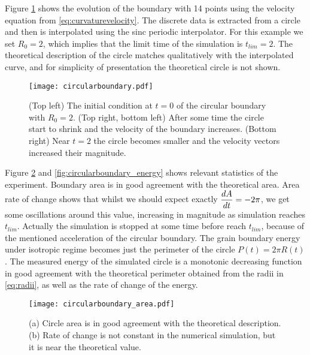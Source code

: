 Figure \ref{fig:circularboundary} shows the evolution of the boundary with 14 points using the velocity equation from \eqref{eq:curvaturevelocity}. The discrete data is extracted from a circle and then is interpolated using the sinc periodic interpolator. For this example we set $R_0 = 2$, which implies that the limit time of the simulation is $t_{lim}=2$. The theoretical description of the circle matches qualitatively with the interpolated curve, and for simplicity of presentation the theoretical circle is not shown. 

\begin{figure}[t]
    \centering
    \texttt{[image: circularboundary.pdf]}
    \caption[Circular boundary evolution]{(Top left) The initial condition at $t=0$ of the circular boundary with $R_0 = 2$. (Top right, bottom left) After some time the circle start to shrink and the velocity of the boundary increases. (Bottom right) Near $t=2$ the circle becomes smaller and the velocity vectors increased their magnitude.}
    \label{fig:circularboundary}
\end{figure}

Figure \ref{fig:circularboundary_area} and \ref{fig:circularboundary_energy} shows relevant statistics of the experiment. Boundary area is in good agreement with the theoretical area. Area rate of change shows that whilst we should expect exactly $\dfrac{dA}{dt} = -2\pi$, we get some oscillations around this value, increasing in magnitude as simulation reaches $t_{lim}$. Actually the simulation is stopped at some time before reach $t_{lim}$, because of the mentioned acceleration of the circular boundary. The grain boundary energy under isotropic regime becomes just the perimeter of the circle $P(t) = 2\pi R(t)$. The measured energy of the simulated circle is a monotonic decreasing function in good agreement with the theoretical perimeter obtained from the radii in \eqref{eq:radii}, as well as the rate of change of the energy. 

\begin{figure}[t]
    \centering
    \texttt{[image: circularboundary\_area.pdf]}
    \subfloat[\label{fig:area}]{\hspace{.55\linewidth}}
    \subfloat[\label{fig:dAdt}]{\hspace{.45\linewidth}}
    \caption[Circular boundary area and rate of change]{(a) Circle area is in good agreement with the theoretical description. (b) Rate of change is not constant in the numerical simulation, but it is near the theoretical value.}
    \label{fig:circularboundary_area}
\end{figure}

